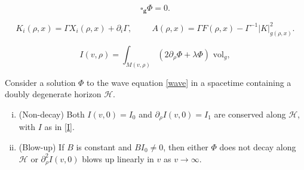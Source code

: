 \documentclass[10pt,a4paper]{amsart}
\begin{document}
\begin{equation} \label{wave}
    \square_{\textbf{g}}\Phi = 0.
\end{equation}

\begin{equation} \label{KAext}
      K_i(\rho,x) = \Gamma X_i(\rho,x) + \partial_i\Gamma, \hspace{1cm}   A(\rho,x) = \Gamma F(\rho,x) - \Gamma^{-1}\vert K \vert^2_{g(\rho,x)}.
\end{equation}

\begin{equation} \label{I}
    I(v,\rho) = \int_{M(v,\rho)}(2\partial_\rho \Phi + \lambda\Phi)\text{ vol}_g,
\end{equation}

\begin{prop} \label{areprop}
    Consider a solution $\Phi$ to the wave equation \eqref{wave} in a spacetime containing a doubly degenerate horizon $\mathcal{H}$.
    \begin{enumerate}[(i)]
        \item \textup{(Non-decay)} Both $I(v,0) = I_0$ and $\partial_\rho I(v,0) = I_1$ are conserved along $\mathcal{H}$, with $I$ as in \eqref{I}.
        \item \textup{(Blow-up)} If $B$ is constant and $BI_0 \neq 0$, then either $\Phi$ does not decay along $\mathcal{H}$ or $\partial_\rho^2 I(v,0)$ blows up linearly in $v$ as $v \to \infty$.
    \end{enumerate}
\end{prop}
\end{document}
